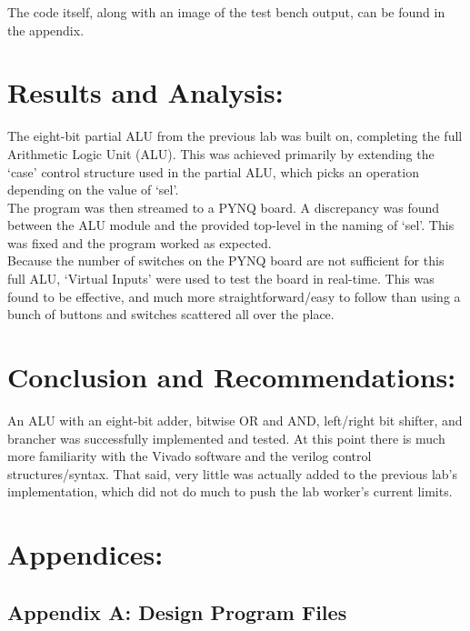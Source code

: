 \documentclass[12pt,a4paper]{article}
\begin{document}
The code itself, along with an image of the test bench output,
can be found in the appendix.

\section*{Results and Analysis:}

The eight-bit partial ALU from the previous lab was built on, completing
the full Arithmetic Logic Unit (ALU). This was achieved primarily by extending
the `case' control structure used in the partial ALU, which picks an
operation depending on the value of `sel'. \\

The program was then streamed to a PYNQ board. A discrepancy was found
between the ALU module and the provided top-level in the naming of `sel'.
This was fixed and the program worked as expected. \\

Because the number of switches on the PYNQ board are not sufficient
for this full ALU, `Virtual Inputs' were used to test the board in real-time.
This was found to be effective, and much more straightforward/easy to follow
than using a bunch of buttons and switches scattered all over the place.


\section*{Conclusion and Recommendations:}

An ALU with an eight-bit adder, bitwise OR and AND, left/right bit shifter,
and brancher was successfully implemented and tested. 
At this point there is much more familiarity with the Vivado software
and the verilog control structures/syntax. That said, very little was
actually added to the previous lab's implementation, which did not do 
much to push the lab worker's current limits.

\newpage
\section*{Appendices:}

\subsection{Appendix A: Design Program Files}
\end{document}
